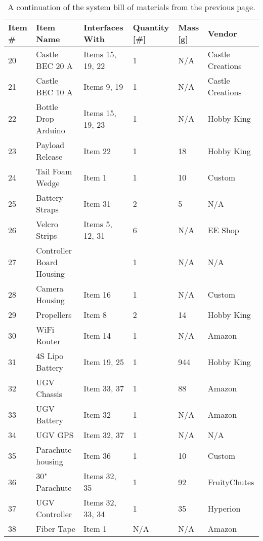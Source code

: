 \documentclass[]{auvsi_doc}
\begin{document}
	\begin{table}[h!]
		\begin{center}
			\caption{A continuation of the system bill of materials from the previous page.}
			\label{table:BOM}
			\begin{tabular}{p{1cm}p{4cm}p{3cm}p{1.5cm}p{1cm}p{2.5cm}}
				\toprule
				Item \# & Item Name & Interfaces With & Quantity [\#] & Mass [g] & Vendor \\
				\midrule
				20 & Castle BEC 20 A & Items 15, 19, 22 & 1 & N/A & Castle \newline Creations \\
				21 & Castle BEC 10 A & Items 9, 19 & 1 & N/A & Castle \newline Creations \\
				22 & Bottle Drop Arduino & Items 15, 19, 23 & 1 & N/A & Hobby King \\
				23 & Payload Release & Item 22 & 1 & 18 & Hobby King \\
				24 & Tail Foam Wedge & Item 1 & 1 & 10 & Custom \\
				25 & Battery Straps & Item 31 & 2 & 5 & N/A \\
				26 & Velcro Strips & Items 5, 12, 31 & 6 & N/A & EE Shop \\
				27 & Controller Board \newline Housing &   & 1 & N/A & N/A \\
				28 & Camera Housing & Item 16 & 1 & N/A & Custom \\
				29 & Propellers & Item 8 & 2 & 14 & Hobby King \\
				30 & WiFi Router & Item 14 & 1 & N/A & Amazon \\
				31 & 4S Lipo Battery & Item 19, 25 & 1 & 944 & Hobby King \\
				32 & UGV Chassis & Item 33, 37 & 1 & 88 & Amazon \\
				33 & UGV Battery & Item 32 & 1 & N/A & Amazon \\
				34 & UGV GPS & Item 32, 37 & 1 & N/A & N/A \\
				35 & Parachute housing & Item 36 & 1 & 10 & Custom \\
				36 & 30" Parachute & Items 32, 35 & 1 & 92 & FruityChutes \\
				37 & UGV Controller & Items 32, 33, 34 & 1 & 35 & Hyperion \\
				38 & Fiber Tape & Item 1 & N/A & N/A & Amazon \\
				\bottomrule
			\end{tabular}
		\end{center}
	\end{table}
	
\end{document}
